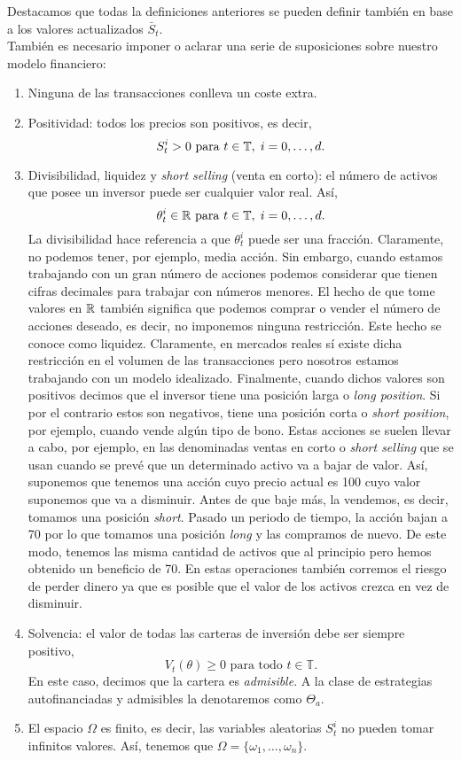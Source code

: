 Destacamos que todas la definiciones anteriores se pueden definir también en base a los valores actualizados $ \bar{S}_t $. \\

También es necesario imponer o aclarar una serie de suposiciones sobre nuestro modelo financiero:
\begin{enumerate}
	\item Ninguna de las transacciones conlleva un coste extra.
	\item Positividad: todos los precios son positivos, es decir,
	\[
	S_t^i > 0 \text{ para } t \in \mathbb{T},\hspace{1mm} i=0,\dots,d.
	\]
	\item Divisibilidad, liquidez y \textit{short selling} (venta en corto): el número de activos que posee un inversor puede ser cualquier valor real. Así,
	\[
	\theta_t^i \in \mathbb{R} \text{ para } t \in \mathbb{T},\hspace{1mm} i=0,\dots,d.
	\]
	La divisibilidad hace referencia a que $ \theta_t^i $ puede ser una fracción. Claramente, no podemos tener, por ejemplo, media acción. Sin embargo, cuando estamos trabajando con un gran número de acciones podemos considerar que tienen cifras decimales para trabajar con números menores. El hecho de que tome valores en $ \mathbb{R} $ también significa que podemos comprar o vender el número de acciones deseado, es decir, no imponemos ninguna restricción. Este hecho se conoce como liquidez. Claramente, en mercados reales sí existe dicha restricción en el volumen de las transacciones pero nosotros estamos trabajando con un modelo idealizado. Finalmente, cuando dichos valores son positivos decimos que el inversor tiene una posición larga o \textit{long position}. Si por el contrario estos son negativos, tiene una posición corta o \textit{short position}, por ejemplo, cuando vende algún tipo de bono. Estas acciones se suelen llevar a cabo, por ejemplo, en las denominadas ventas en corto o \textit{short selling} que se usan cuando se prevé que un determinado activo va a bajar de valor. Así, suponemos que tenemos una acción cuyo precio actual es 100 cuyo valor suponemos que va a disminuir. Antes de que baje más, la vendemos, es decir, tomamos una posición \textit{short}. Pasado un periodo de tiempo, la acción bajan a 70 por lo que tomamos una posición \textit{long} y las compramos de nuevo. De este modo, tenemos las misma cantidad de activos que al principio pero hemos obtenido un beneficio de 70. En estas operaciones también corremos el riesgo de perder dinero ya que es posible que el valor de los activos crezca en vez de disminuir. 
	
	\item Solvencia: el valor de todas las carteras de inversión debe ser siempre positivo,
	\[
	V_t (\theta) \geq 0\text{ para todo } t \in \mathbb{T}.
	\]
	En este caso, decimos que la cartera es \textit{admisible}. A la clase de estrategias autofinanciadas y admisibles la denotaremos como $ \Theta_a $.
	\item El espacio $ \Omega $ es finito, es decir, las variables aleatorias $ S_t^i $ no pueden tomar infinitos valores. Así, tenemos que $ \Omega = \{ \omega_1,\dots,\omega_n\} $.
\end{enumerate}

